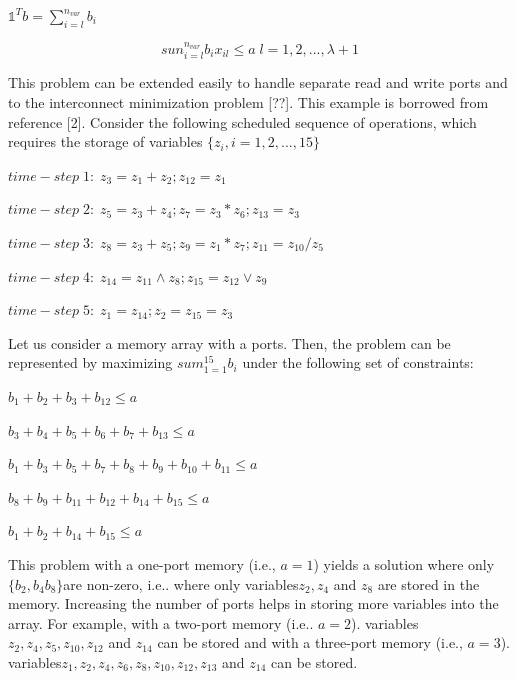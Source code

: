 \begin{center}
$\mathds{1}^{T} b = \sum_{i=l}^{n_{var}}b_{i}$
\end{center}

\begin{equation}\label{1b}
sun_{i=l}^{n_{var}}b_{i}x_{il} \leq a \; l=1,2,..., \lambda +1 
\end{equation}

This problem can be extended easily to handle separate read and write ports and to the interconnect minimization problem [??]. 
This example is borrowed from reference [2]. Consider the following scheduled sequence of operations, which requires the storage of variables $ \{z_{i}, i =1,2,...,15\} $ 


$time-step \; 1:\; z_{3}=z_{1}+z_{2};z_{12}=z_{1}$

$time-step \; 2:\; z_{5}=z_{3}+z_{4};z_{7}=z_{3}*z_{6};z_{13}=z_{3}$

$time-step \; 3:\; z_{8}=z_{3}+z_{5};z_{9}=z_{1}*z_{7};z_{11}=z_{10}/z_{5}$

$time-step \; 4:\; z_{14}=z_{11}\wedge z_{8};z_{15}=z_{12}\vee z_{9}$

$time-step \; 5:\; z_{1}=z_{14};z_{2}=z_{15}=z_{3}$


Let us consider a memory array with a ports. Then, the problem can be represented by maximizing $  sum_{1=1}^{15} b_{i}$ under the following set of constraints: 

\begin{flushright}
$ b_{1}+b_{2}+b_{3}+b_{12}\leq a $

$ b_{3}+b_{4}+b_{5}+b_{6}+b_{7}+b_{13}\leq a $

$ b_{1}+b_{3}+b_{5}+b_{7}+b_{8}+b_{9}+b_{10}+b_{11}\leq a $

$ b_{8}+b_{9}+b_{11}+b_{12}+b_{14}+b_{15}\leq a $

$ b_{1}+b_{2}+b_{14}+b_{15}\leq a $
\end{flushright}


This problem with a one-port memory (i.e., $ a = 1 $) yields a solution where only $ \{b_{2},b_{4}b_{8} \}$are non-zero, i.e.. where only variables$ z_{2},z_{4} $ and $z_{8}$  are stored in the memory. Increasing the number of ports helps in storing more variables into the array. For example, with a two-port memory (i.e.. $ a = 2 $). variables $ z_{2},z_{4} ,z_{5},z_{10} ,z_{12}  $ and $z_{14}$ can be stored and with a three-port memory (i.e., $ a=3 $). variables$ z_{1},z_{2},z_{4} ,z_{6},z_{8},z_{10} ,z_{12},z_{13}  $ and $ z_{14} $ can be stored.

